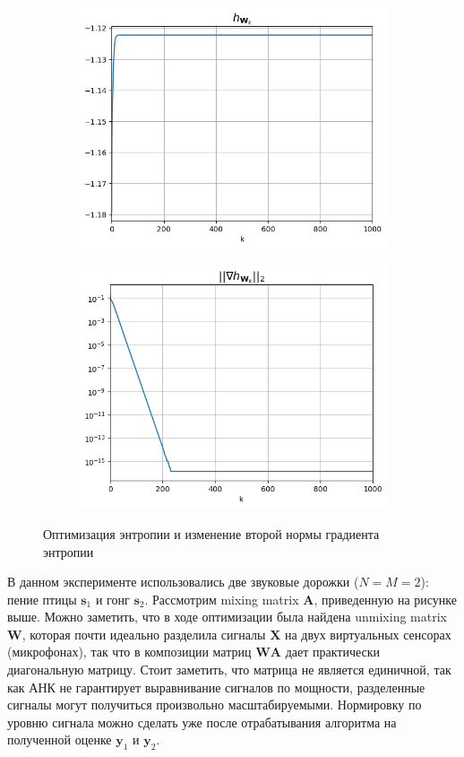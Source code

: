 \documentclass[a4paper,12pt]{article}
\begin{document}
	\begin{figure}[h!]
		\centering
		\begin{subfigure}{0.3\linewidth}
			\includegraphics[width=\linewidth]{plots/h1}
		\end{subfigure}
		\begin{subfigure}{0.3\linewidth}
			\includegraphics[width=\linewidth]{plots/grad1}
		\end{subfigure}
		\caption{Оптимизация энтропии и изменение второй нормы градиента энтропии}
	\end{figure}
	
	В данном эксперименте использовались две звуковые дорожки ($N=M=2$): пение птицы $\mathbf{s}_1$ и гонг $\mathbf{s}_2$. Рассмотрим mixing matrix $\mathbf{A}$, приведенную на рисунке выше. Можно заметить, что в ходе оптимизации была найдена unmixing matrix $\mathbf{W}$, которая почти идеально разделила сигналы  $\mathbf{X} $ на двух виртуальных сенсорах (микрофонах), так что в композиции матриц $\mathbf{WA}$ дает практически диагональную матрицу. Стоит заметить, что матрица не является единичной, так как АНК не гарантирует выравнивание сигналов по мощности, разделенные сигналы могут получиться произвольно масштабируемыми. Нормировку по уровню сигнала можно сделать уже после отрабатывания алгоритма на полученной оценке $\mathbf{y}_1$ и $\mathbf{y}_2$.
	
\end{document}
